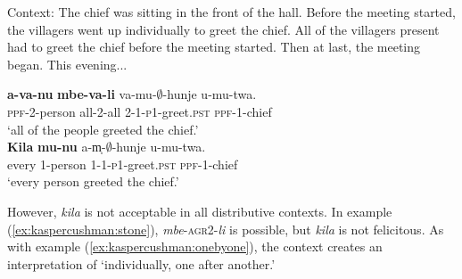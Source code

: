 \documentclass[output=paper,modfonts,nonflat]{langsci/langscibook}
\begin{document}
\begin{exe}

\ex Context: The chief was sitting in the front of the hall.  Before the meeting started, the villagers went up individually to greet the chief. All of the villagers present had to greet the chief before the meeting started. Then at last, the meeting began. This evening... \label{ex:kaspercushman:didgreet}

\begin{xlist}

\ex 
\gll \textbf{a-va-nu} \textbf{mbe-va-li} va-mu-$\emptyset$-hunje u-mu-twa. \\
\textsc{ppf}-2-person all-2-all 2-1-\textsc{p1}-greet.\textsc{pst} \textsc{ppf}-1-chief \\
\glt `all of the people greeted the chief.' \\



\ex 
\gll \textbf{Kila} \textbf{mu-nu} a-m̩-$\emptyset$-hunje u-mu-twa. \\
every 1-person 1-1-\textsc{p1}-greet.\textsc{pst} \textsc{ppf}-1-chief  \\ \label{ex:kaspercushman:everygreeted}
\glt `every person greeted the chief.' 

\end{xlist}
\end{exe}


However, \textit{kila} is not acceptable in all distributive contexts. In example (\ref{ex:kaspercushman:stone}), \textit{mbe}-\textsc{agr2}-\textit{li} is possible, but \textit{kila} is not felicitous. As with example (\ref{ex:kaspercushman:onebyone}), the context creates an interpretation of `individually, one after another.'  
\end{document}
